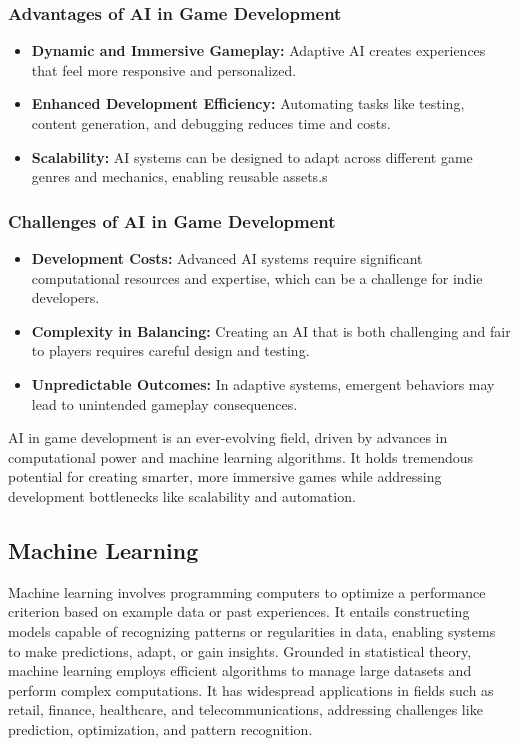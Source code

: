 \documentclass[12pt,oneside,openright,a4paper]{cpe-english-project}
\begin{document}
\subsubsection{Advantages of AI in Game Development}
\begin{itemize}
\item  \textbf{Dynamic and Immersive Gameplay:}
Adaptive AI creates experiences that feel more responsive and personalized.
\item  \textbf{Enhanced Development Efficiency:}
Automating tasks like testing, content generation, and debugging reduces time and costs.
\item  \textbf{Scalability:}
AI systems can be designed to adapt across different game genres and mechanics, enabling reusable assets.s
\end{itemize}
\subsubsection{Challenges of AI in Game Development}
\begin{itemize}
\item  \textbf{Development Costs:}
Advanced AI systems require significant computational resources and expertise, which can be a challenge for indie developers.
\item  \textbf{Complexity in Balancing:}
Creating an AI that is both challenging and fair to players requires careful design and testing.
\item  \textbf{Unpredictable Outcomes:}
In adaptive systems, emergent behaviors may lead to unintended gameplay consequences.
\end{itemize}
AI in game development is an ever-evolving field, driven by advances in computational power and machine learning algorithms. It holds tremendous potential for creating smarter, more immersive games while addressing development bottlenecks like scalability and automation.

\subsection{Machine Learning}

Machine learning involves programming computers to optimize a performance criterion based on example data or past experiences. It entails constructing models capable of recognizing patterns or regularities in data, enabling systems to make predictions, adapt, or gain insights. Grounded in statistical theory, machine learning employs efficient algorithms to manage large datasets and perform complex computations. It has widespread applications in fields such as retail, finance, healthcare, and telecommunications, addressing challenges like prediction, optimization, and pattern recognition.\par
\end{document}
